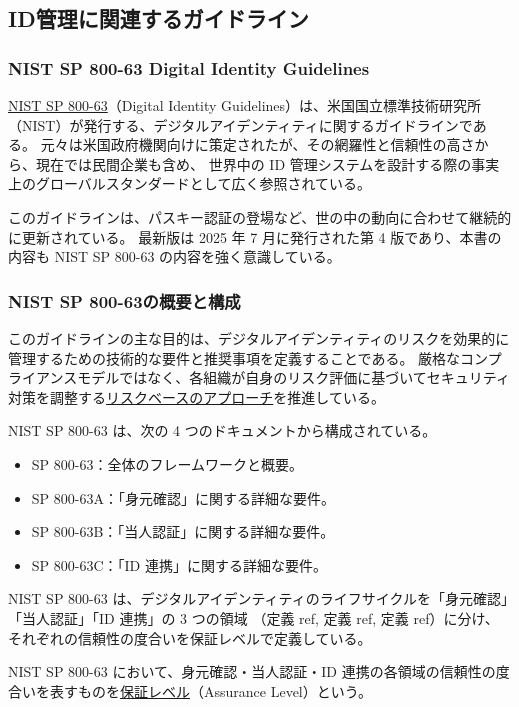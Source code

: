 \documentclass[uplatex]{jsarticle}
\def\ref#1{ref}%
\def\label#1{}%
\begin{document}
\subsection{ID管理に関連するガイドライン}

\subsubsection{NIST SP 800-63 Digital Identity Guidelines}

\underline{NIST SP 800-63}（Digital Identity Guidelines）は、米国国立標準技術研究所（NIST）が発行する、デジタルアイデンティティに関するガイドラインである。
元々は米国政府機関向けに策定されたが、その網羅性と信頼性の高さから、現在では民間企業も含め、
世界中の ID 管理システムを設計する際の事実上のグローバルスタンダードとして広く参照されている。

このガイドラインは、パスキー認証の登場など、世の中の動向に合わせて継続的に更新されている。
最新版は 2025 年 7 月に発行された第 4 版であり、本書の内容も NIST SP 800-63 の内容を強く意識している。

\subsubsection{NIST SP 800-63の概要と構成}

このガイドラインの主な目的は、デジタルアイデンティティのリスクを効果的に管理するための技術的な要件と推奨事項を定義することである。
厳格なコンプライアンスモデルではなく、各組織が自身のリスク評価に基づいてセキュリティ対策を調整する\underline{リスクベースのアプローチ}を推進している。

NIST SP 800-63 は、次の 4 つのドキュメントから構成されている。
\begin{itemize}
\item SP 800-63：全体のフレームワークと概要。
\item SP 800-63A：「身元確認」に関する詳細な要件。
\item SP 800-63B：「当人認証」に関する詳細な要件。
\item SP 800-63C：「ID 連携」に関する詳細な要件。
\end{itemize}

NIST SP 800-63 は、デジタルアイデンティティのライフサイクルを「身元確認」「当人認証」「ID 連携」の 3 つの領域
（定義 \ref{dfn:identity-proofing}, 定義 \ref{dfn:authentication}, 定義 \ref{dfn:identity-federation}）に分け、
それぞれの信頼性の度合いを保証レベルで定義している。

\begin{dfn}[保証レベル]\label{dfn:ch5-assurance-level}
NIST SP 800-63 において、身元確認・当人認証・ID 連携の各領域の信頼性の度合いを表すものを\underline{保証レベル}（Assurance Level）という。
\end{dfn}
\end{document}

